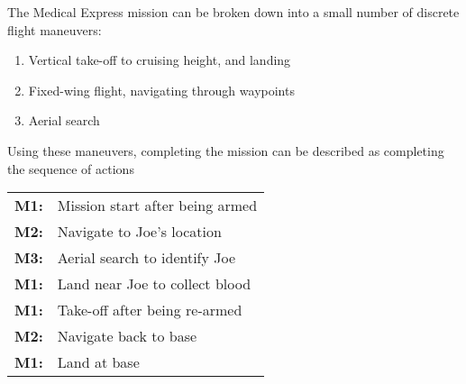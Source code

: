 \label{sec:flight}

The Medical Express mission can be broken down into a small number of discrete flight maneuvers:
\begin{enumerate}[label=\bfseries M\arabic*:] \itemsep-2pt
	\item Vertical take-off to cruising height, and landing
	\item Fixed-wing flight, navigating through waypoints
	\item Aerial search
\end{enumerate}

Using these maneuvers, completing the mission can be described as completing the sequence of actions\\
\begin{tabular}[!ht]{r l}
	\textbf{M1:} & Mission start after being armed\\
	\textbf{M2:} & Navigate to Joe's location\\
	\textbf{M3:} & Aerial search to identify Joe\\
	\textbf{M1:} & Land near Joe to collect blood\\
	\textbf{M1:} & Take-off after being re-armed\\
	\textbf{M2:} & Navigate back to base\\
	\textbf{M1:} & Land at base
\end{tabular}